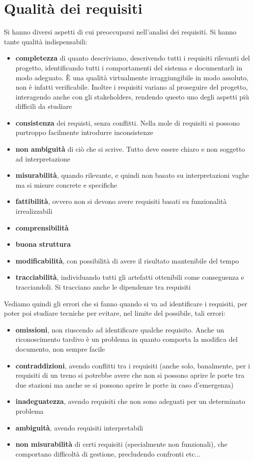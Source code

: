\documentclass[a4paper,12pt, oneside]{book}
\begin{document}
\section{Qualità dei requisiti}
Si hanno diversi aspetti di cui preoccuparsi nell'analisi dei requisiti. Si
hanno tante qualità indispensabili:
\begin{itemize}
  \item \textbf{completezza} di quanto descriviamo, descrivendo tutti i
  requisiti rilevanti del progetto, identificando tutti i comportamenti del
  sistema e documentarli in modo adeguato. È una qualità virtualmente
  irraggiungibile in modo assoluto, non è infatti verificabile. Inoltre i
  requisiti variano al proseguire del progetto, interagendo anche con gli
  stakeholders, rendendo questo uno degli aspetti più difficili da studiare
  \item \textbf{consistenza} dei requisti, senza conflitti. Nella mole di
  requisiti si possono purtroppo facilmente introdurre inconsistenze
  \item \textbf{non ambiguità} di ciò che si scrive. Tutto deve essere chiaro e
  non soggetto ad interpretazione
  \item \textbf{misurabilità}, quando rilevante, e quindi non basato su
  interpretazioni vaghe ma si misure concrete e specifiche 
  \item \textbf{fattibilità}, ovvero non si devono avere requisiti basati su
  funzionalità irrealizzabili
  \item \textbf{comprensibilità}
  \item \textbf{buona struttura}
  \item \textbf{modificabilità}, con possibilità di avere il risultato
  mantenibile del tempo 
  \item \textbf{tracciabilità}, individuando tutti gli artefatti ottenibili come
  conseguenza e tracciandoli. Si tracciano anche le dipendenze tra requisiti
\end{itemize}
Vediamo quindi gli errori che si fanno quando si va ad identificare i requisiti,
per poter poi studiare tecniche per evitare, nel limite del possibile, tali
errori:
\begin{itemize}
  \item \textbf{omissioni}, non riuscendo ad identificare qualche
  requisito. Anche un riconoscimento tardivo è un problema in quanto comporta la
  modifica del documento, non sempre facile
  \item \textbf{contraddizioni}, avendo conflitti tra i requisiti (anche solo,
  banalmente, per i requisiti di un treno si potrebbe avere che non si possono
  aprire le porte tra due stazioni ma anche se si possono aprire le porte in
  caso d'emergenza) 
  \item \textbf{inadeguatezza}, avendo requisiti che non sono adeguati per
  un determinato problema
  \item \textbf{ambiguità}, avendo requisiti interpretabili
  \item \textbf{non misurabilità} di certi requisiti (specialmente non
  funzionali), che comportano difficoltà di gestione, precludendo confronti
  etc$\ldots$ 
\end{itemize}
\end{document}
